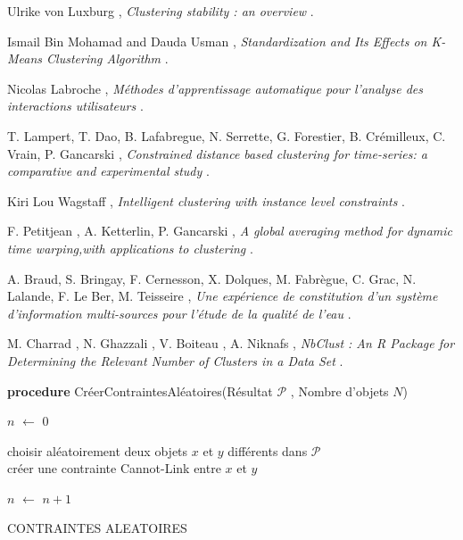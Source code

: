 \documentclass[11pt, openany]{report}
\begin{document}
\newpage
\newpage
\begin{thebibliography}{9} 
 Ulrike von Luxburg ,\emph{ Clustering stability : an overview} .

Ismail Bin Mohamad and Dauda Usman  ,\emph{ Standardization and Its Effects on K-Means Clustering Algorithm } .

  Nicolas Labroche  ,\emph{ Méthodes d’apprentissage automatique pour l’analyse des interactions utilisateurs 
} .

T. Lampert, T. Dao, B. Lafabregue, N. Serrette, G. Forestier, B. Crémilleux, C. Vrain, P. Gancarski  ,\emph{ Constrained distance based clustering for time-series: a comparative and experimental study} .

Kiri Lou Wagstaff   ,\emph{ Intelligent clustering with instance
level constraints} .

F. Petitjean , A. Ketterlin, P. Gancarski   ,\emph{ A global averaging method for dynamic time warping,with applications to clustering } .

 A. Braud, S.  Bringay, F. Cernesson, X. Dolques, M. Fabrègue, C. Grac, N.  Lalande, F. Le Ber, M. Teisseire ,\emph{ Une expérience de constitution d’un système d’information multi-sources pour l’étude de la qualité de l’eau} .

 M. Charrad , N.  Ghazzali , V. Boiteau , A. Niknafs , \emph{NbClust : An R Package for Determining the Relevant Number of Clusters in a Data Set} .

\end{thebibliography}


\newpage

\begin{algorithm}[H]
\textbf{procedure} CréerContraintesAléatoires(Résultat $\mathcal{P}$ , Nombre d'objets $N$)
   
   $n$ $\leftarrow$ 0 \\
   {
   		choisir aléatoirement deux objets $x$ et $y$ différents  dans $\mathcal{P}$  \\
   		
    	{
       		créer une contrainte Cannot-Link entre $x$ et $y$ \\
   		}
   		
   		$n$ $\leftarrow$  $n + 1$
   }

\caption{CONTRAINTES ALEATOIRES}
\end{algorithm}
\end{document}
